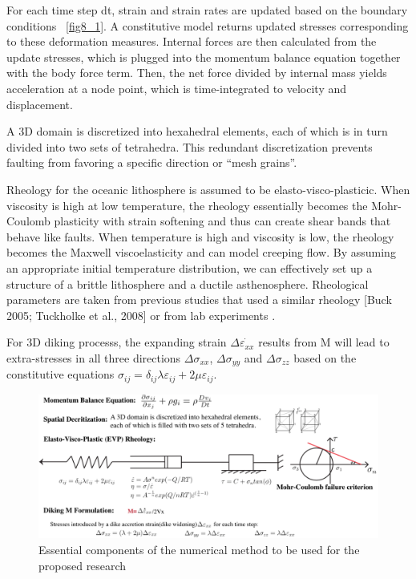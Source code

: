 \documentclass[12pt]{article}
\begin{document}
For each time step dt, strain and strain rates are updated based on the boundary conditions ~\ref{fig8_1}. A constitutive model returns updated stresses corresponding to these deformation measures. Internal forces are then calculated from the update stresses, which is plugged into the momentum balance equation together with the body force term. Then, the net force divided by internal mass yields acceleration at a node point, which is time-integrated to velocity and displacement. 

A 3D domain is discretized into hexahedral elements, each of which is in turn divided into two sets of tetrahedra. This redundant discretization prevents faulting from favoring a specific direction or ``mesh grains''. 

Rheology for the oceanic lithosphere is assumed to be elasto-visco-plasticic. When viscosity is high at low temperature, the rheology essentially becomes the Mohr-Coulomb plasticity with strain softening and thus can create shear bands that behave like faults. When temperature is high and viscosity is low, the rheology becomes the Maxwell viscoelasticity and can model creeping flow. By assuming an appropriate initial temperature distribution, we can effectively set up a structure of a brittle lithosphere and a ductile asthenosphere. Rheological parameters are taken from previous studies that used a similar rheology [Buck 2005; Tuckholke et al., 2008] or from lab experiments \citep[e.g.,][]{Kirby1987}. 

For 3D diking processs, the expanding strain  $\Delta\dot{\varepsilon_{xx}}$ results from M will lead to extra-stresses in all three directions $\Delta\sigma_{xx}$, $\Delta\sigma_{yy}$ and $\Delta\sigma_{zz}$ based on the constitutive equations $\sigma_{ij}=\delta_{ij}\lambda\varepsilon_{ij}+2\mu\varepsilon_{ij}$.

\begin{figure}[H]
 \centering
  \includegraphics[scale=0.65]{fig7_2.png}
 \caption{\small{Essential components of the numerical method to be used for the proposed research}}
 \label{fig7_1}
\end{figure}
\end{document}
